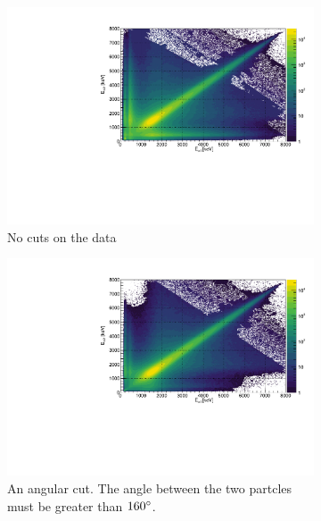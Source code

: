 \begin{figure}[H]
	\begin{subfigure}[t]{0.49\linewidth}
		\includegraphics[width=\linewidth]{../figures/EENoCuts.pdf}
		\caption{No cuts on the data}
		\label{fig:EENoCuts}
	\end{subfigure}\hfill
	\begin{subfigure}[t]{0.49\linewidth}
		\includegraphics[width=\linewidth]{../figures/EEAngleCut.pdf}
		\caption{An angular cut. The angle between the two partcles must be greater than $160\degree$.}
		\label{fig:EEAngleCut}
	\end{subfigure}
	\begin{subfigure}[t]{0.49\linewidth}

\end{subfigure}
\end{figure}
